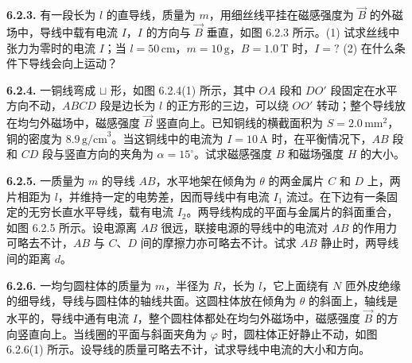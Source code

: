 \vfill
\newpage

\textbf{6.2.3.} 有一段长为 $l$ 的直导线，质量为 $m$，用细丝线平挂在磁感强度为 $\vec{B}$ 的外磁场中，导线中载有电流 $I$，$I$ 的方向与 $\vec{B}$ 垂直，如图 6.2.3 所示。(1) 试求丝线中张力为零时的电流 $I$；当 $l = 50\,\mathrm{cm}$，$m = 10\,\mathrm{g}$，$B = 1.0\,\mathrm{T}$ 时，$I = ?$ (2) 在什么条件下导线会向上运动？

\begin{center}
\end{center}

\vfill
\newpage

\textbf{6.2.4.} 一铜线弯成 $\sqcup$ 形，如图 6.2.4(1) 所示，其中 $OA$ 段和 $DO'$ 段固定在水平方向不动，$ABCD$ 段是边长为 $l$ 的正方形的三边，可以绕 $OO'$ 转动；整个导线放在均匀外磁场中，磁感强度 $\vec{B}$ 竖直向上。已知铜线的横截面积为 $S = 2.0\,\mathrm{mm}^{2}$，铜的密度为 $8.9\,\mathrm{g/cm}^{3}$。当这铜线中的电流为 $I = 10\,\mathrm{A}$ 时，在平衡情况下，$AB$ 段和 $CD$ 段与竖直方向的夹角为 $\alpha = 15^{\circ}$。试求磁感强度 $B$ 和磁场强度 $H$ 的大小。

\begin{center}
\end{center}

\vfill
\newpage

\textbf{6.2.5.} 一质量为 $m$ 的导线 $AB$，水平地架在倾角为 $\theta$ 的两金属片 $C$ 和 $D$ 上，两片相距为 $l$，并维持一定的电势差，因而导线中有电流 $I_{1}$ 流过。在下边有一条固定的无穷长直水平导线，载有电流 $I_{2}$。两导线构成的平面与金属片的斜面重合，如图 6.2.5 所示。设电源离 $AB$ 很远，联接电源的导线中的电流对 $AB$ 的作用力可略去不计，$AB$ 与 $C$、$D$ 间的摩擦力亦可略去不计。试求 $AB$ 静止时，两导线间的距离 $d$。

\begin{center}
\end{center}

\vfill
\newpage

\textbf{6.2.6.} 一均匀圆柱体的质量为 $m$，半径为 $R$，长为 $l$，它上面绕有 $N$ 匝外皮绝缘的细导线，导线与圆柱体的轴线共面。这圆柱体放在倾角为 $\theta$ 的斜面上，轴线是水平的，导线中通有电流 $I$，整个圆柱体都处在均匀外磁场中，磁感强度 $\vec{B}$ 的方向竖直向上。当线圈的平面与斜面夹角为 $\varphi$ 时，圆柱体正好静止不动，如图 6.2.6(1) 所示。设导线的质量可略去不计，试求导线中电流的大小和方向。

\begin{center}
\end{center}

